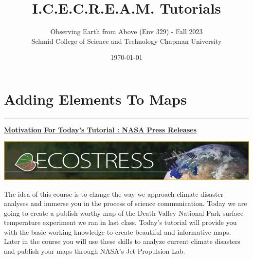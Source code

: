 \documentclass[oneside,a4paper,11pt,explicit]{book}
\title{I.C.E.C.R.E.A.M. Tutorials}
\subtitle{\small Observing Earth from Above (Env 329) - Fall 2023  \\
	\small Schmid College of Science and Technology Chapman University}
\date{\today}
\begin{document}
	
\dominitoc

\setcounter{chapter}{3} %

\chapter{Adding Elements To Maps} %

\vspace{-2em}

\minitoc

\hrule

\vspace{1em}


\vspace{1 em}

\textbf{\underline{Motivation For Today's Tutorial : NASA Press Releases}}

\vspace{1 em}

{\centering

\includegraphics[width=\textwidth]{ecostress_banner.jpg}}

\vspace{1 em}

The idea of this course is to change the way we approach climate disaster analyses and immerse you in the process of science communication. Today we are going to create a publish worthy map of the Death Valley National Park surface temperature experiment we ran in last class. Today's tutorial will provide you with the basic working knowledge to create beautiful and informative maps. Later in the course you will use these skills to analyze current climate disasters and publish your maps through NASA's Jet Propulsion Lab.
\end{document}
